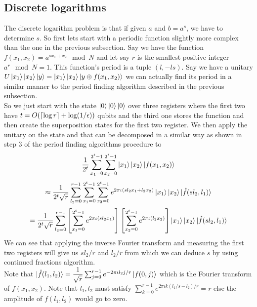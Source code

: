 \documentclass{report}
\DeclarePairedDelimiter{\ceil}{\lceil}{\rceil}
\begin{document}
\subsection{Discrete logarithms}
The discrete logarithm problem is that if given $a$ and $b = a^s$, we have to determine $s$. So first lets start with a periodic function slightly more complex than the one in the previous subsection. Say we have the function $f(x_1,x_2) = a^{sx_1 + x_2}\mod N$ and let say $r$ is the smallest positive integer $a^r\mod N = 1$. This function's period is a tuple $(l,-ls)$. Say we have a unitary $U\ket{x_1}\ket{x_2}\ket{y} = \ket{x_1}\ket{x_2}\ket{y \oplus f(x_1,x_2)}$ we can actually find its period in a similar manner to the period finding algorithm described in the previous subsection.\\
So we just start with the state $\ket{0}\ket{0}\ket{0}$ over three registers where the first two have $t = O(\ceil{\log r} + \log(1/\epsilon))$ qubits and the third one stores the function and then create the superposition states for the first two register. We then apply the unitary on the state and that can be decomposed in a similar way as shown in step 3 of the period finding algorithms procedure to $$\dfrac{1}{2^t}\sum_{x_1=0}^{2^t-1}\sum_{x_2=0}^{2^t-1}\ket{x_1}\ket{x_2}\ket{f(x_1,x_2)}$$ 
$$\approx \dfrac{1}{2^t\sqrt{r}}\sum_{l_2=0}^{r-1}\sum_{x_1=0}^{2^t-1}\sum_{x_2=0}^{2^t-1}e^{2\pi\iota(sl_2x_1 + l_2x_2)}\ket{x_1}\ket{x_2}\ket{\hat{f}(sl_2,l_1)}$$
\begin{equation}= \dfrac{1}{2^t\sqrt{r}}\sum_{l_2=0}^{r-1}\left[\sum_{x_1=0}^{2^t-1}e^{2\pi\iota(sl_2x_1)}\right]\left[\sum_{x_2=0}^{2^t-1}e^{2\pi\iota(l_2x_2)}\right]\ket{x_1}\ket{x_2}\ket{\hat{f}(sl_2,l_1)}\end{equation}
We can see that applying the inverse Fourier transform and measuring the first two registers will give us $sl_2/r$ and $l_2/r$ from which we can deduce $s$ by using continued fractions algorithm.\\
Note that $\ket{\hat{f}(l_1,l_2)} = \dfrac{1}{\sqrt{r}}\sum_{j=0}^{r-1}e^{-2\pi\iota{l_2j}/r}\ket{f(0,j)}$ which is the Fourier transform of $f(x_1,x_2)$. Note that $l_1,l_2$ must satisfy $\sum_{k=0}^{r-1}e^{2\pi\iota{k(l_1/s - l_2)}/r} = r$ else the amplitude of $f(l_1,l_2)$ would go to zero.\\
\end{document}

